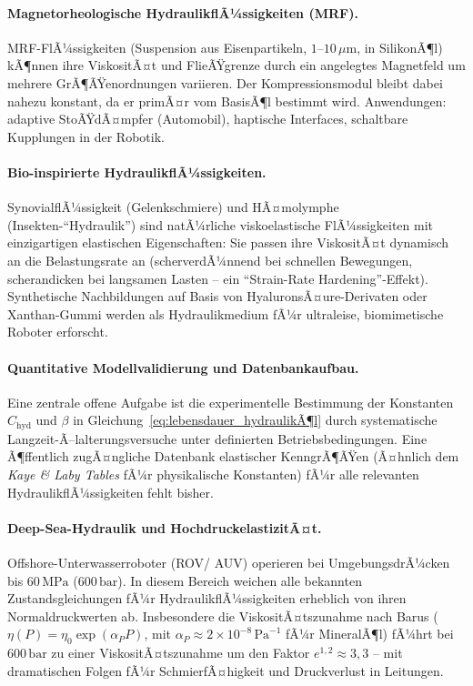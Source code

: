 ﻿\documentclass[a4paper,12pt]{scrreprt}
\theoremstyle{definition}
\begin{document}
\paragraph{Magnetorheologische HydraulikflÃ¼ssigkeiten (MRF).}
MRF-FlÃ¼ssigkeiten (Suspension aus Eisenpartikeln, $1$--$10\,\mu\mathrm{m}$,
in SilikonÃ¶l) kÃ¶nnen ihre ViskositÃ¤t und FlieÃŸgrenze durch ein angelegtes
Magnetfeld um mehrere GrÃ¶ÃŸenordnungen variieren. Der Kompressionsmodul
bleibt dabei nahezu konstant, da er primÃ¤r vom BasisÃ¶l bestimmt wird.
Anwendungen: adaptive StoÃŸdÃ¤mpfer (Automobil), haptische Interfaces,
schaltbare Kupplu\-ngen in der Robotik.

\paragraph{Bio-inspirierte HydraulikflÃ¼ssigkeiten.}
SynovialflÃ¼ssigkeit (Gelenkschmiere) und HÃ¤molymphe (Insekten-``Hydraulik'')
sind natÃ¼rliche viskoelastische FlÃ¼ssigkeiten mit einzigartigen elastischen
Eigenschaften: Sie passen ihre ViskositÃ¤t dynamisch an die Belastungsrate
an (scherverdÃ¼nnend bei schnellen Bewegungen, scherandicken bei langsamen
Lasten -- ein ``Strain-Rate Hardening''-Effekt). Synthetische Nachbildungen
auf Basis von HyaluronsÃ¤ure-Derivaten oder Xanthan-Gummi werden als
Hydraulikmedium fÃ¼r ultraleise, biomimetische Roboter erforscht.

\paragraph{Quantitative Modellvalidierung und Datenbankaufbau.}
Eine zentrale offene Aufgabe ist die experimentelle Bestimmung der
Konstanten $C_{\mathrm{hyd}}$ und $\beta$ in Gleichung~\eqref{eq:lebensdauer_hydraulikÃ¶l}
durch systematische Langzeit-Ã–lalterungsversuche unter definierten
Betriebsbedingungen. Eine Ã¶ffentlich zugÃ¤ngliche Datenbank elastischer
KenngrÃ¶ÃŸen (Ã¤hnlich dem \emph{Kaye \& Laby Tables} fÃ¼r physikalische
Konstanten) fÃ¼r alle relevanten HydraulikflÃ¼ssigkeiten fehlt bisher.

\paragraph{Deep-Sea-Hydraulik und HochdruckelastizitÃ¤t.}
Offshore-Unterwasserroboter (ROV\newline/ AUV) operieren bei UmgebungsdrÃ¼cken
bis $60\,\mathrm{MPa}$ ($600\,\mathrm{bar}$). In diesem Bereich
weichen alle bekannten Zustandsgleichungen fÃ¼r HydraulikflÃ¼ssigkeiten
erheblich von ihren Normaldruckwerten ab. Insbesondere die
ViskositÃ¤tszunahme nach Barus ($\eta(P) = \eta_0 \exp(\alpha_P P)$,
mit $\alpha_P \approx 2 \times 10^{-8}\,\mathrm{Pa}^{-1}$ fÃ¼r MineralÃ¶l)
fÃ¼hrt bei $600\,\mathrm{bar}$ zu einer ViskositÃ¤tszunahme um den Faktor
$e^{1{,}2} \approx 3{,}3$ -- mit dramatischen Folgen fÃ¼r SchmierfÃ¤higkeit
und Druckverlust in Leitungen.
\end{document}
